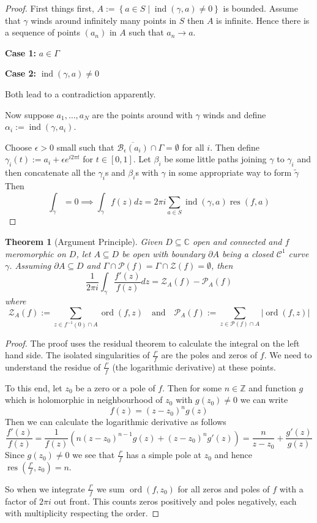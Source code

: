 \documentclass[11pt]{article}
\newcommand{\defeq}{:=}
\newcommand{\abs}[1]{\left|#1\right|}
\DeclareMathOperator{\ord}{\text{ord}}
\DeclareMathOperator{\ind}{\text{ind}}
\DeclareMathOperator{\res}{\text{res}}
\newcommand{\relmiddle}[1]{\mathrel{}\middle#1\mathrel{}}
\newcommand{\rmv}{\relmiddle|}
\newcommand{\C}{\mathbb{C}}
\newcommand{\Z}{\mathbb{Z}}
\newcommand{\mdf}[1]{{\color{red} #1}}
\newtheorem{theorem}{Theorem}[section]
\begin{document}
\begin{proof}
First things first, $A\defeq\left\{a \in S \rmv \ind(\gamma, a)\neq 0 \right\}$ is bounded.
Assume that $\gamma$ winds around infinitely many points in $S$ then $A$ is infinite.
Hence there is a sequence of points $(a_n)$ in $A$ such that $a_n\to a$.

\textbf{Case 1:} $a\in\Gamma$

\textbf{Case 2:} $\ind(\gamma, a)\neq 0$

Both lead to a contradiction apparently.

Now suppose $a_1, \dots, a_N$ are the points around with $\gamma$ winds and define $\alpha_i\defeq\ind(\gamma,a_i)$.

Choose $\epsilon >0$ small such that $\overline{\mathcal{B}_\epsilon(a_i)}\cap\Gamma=\emptyset$ for all $i$.
Then define $\gamma_i(t)\defeq a_i+\epsilon e^{i 2 \pi t}$ for $t\in [0, 1]$.
Let $\beta_i$ be some little paths joining $\gamma$ to $\gamma_i$ and then concatenate all the $\gamma_i$s and $\beta_i$s with $\gamma$ in some appropriate way to form $\widetilde{\gamma}$
Then 
\[
	\int_{\widetilde{\gamma}}=0\implies\int_\gamma f(z)dz = 2\pi i \sum_{a\in S}\ind(\gamma, a)\res(f, a)
\]
\end{proof}

\begin{theorem}[Argument Principle]
Given $D\subseteq\C$ open and connected and $f$ meromorphic on $D$, let $A\subseteq D$ be open with boundary $\partial A$ being a closed $\mathcal{C}^1$ curve $\gamma$.
Assuming $\partial A \subseteq D$ and $\Gamma\cap\mathcal{P}(f)=\Gamma\cap\mathcal{Z}(f)=\emptyset$, then
\[
	\frac{1}{2\pi i}\int_\gamma \frac{f'(z)}{f(z)}dz = \mathcal{Z}_A(f)-\mathcal{P}_A(f)
\]
where
\[
	\mathcal{Z}_A(f)\defeq\sum_{z\in f^{-1}(0)\cap A}\ord(f, z) \quad \text{and} \quad \mathcal{P}_A(f)\defeq\sum_{z\in\mathcal{P}(f)\cap A}\abs{\ord(f, z)}
\]
\end{theorem}

\begin{proof}
The proof uses the residual theorem to calculate the integral on the left hand side.
The isolated singularities of $\frac{f'}{f}$ are the poles and zeros of $f$.
We need to understand the residue of $\frac{f'}{f}$ (the \mdf{logarithmic derivative}) at these points.

To this end, let $z_0$ be a zero or a pole of $f$.
Then for some $n\in \Z$ and function $g$ which is holomorphic in neighbourhood of $z_0$ with $g(z_0)\neq 0$ we can write
\[
	f(z)=(z-z_0)^ng(z)
\]
Then we can calculate the logarithmic derivative as follows
\[
	\frac{f'(z)}{f(z)}=\frac{1}{f(z)}\left( n(z-z_0)^{n-1}g(z) + (z-z_0)^n g'(z) \right) = \frac{n}{z-z_0} + \frac{g'(z)}{g(z)}
\]
Since $g(z_0)\neq 0$ we see that $\frac{f'}{f}$ has a simple pole at $z_0$ and hence $\res\left(\frac{f'}{f}, z_0\right)=n$.

So when we integrate $\frac{f'}{f}$ we sum $\ord(f, z_0)$ for all zeros and poles of $f$ with a factor of $2\pi i$ out front.
This counts zeros positively and poles negatively, each with multiplicity respecting the order.
\end{proof}
\end{document}

